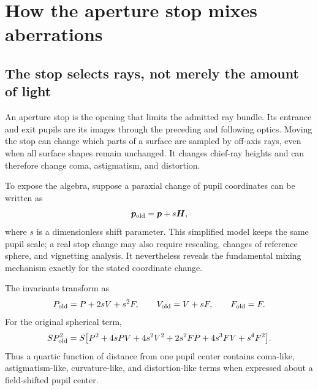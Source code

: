 \chapter{How the aperture stop mixes aberrations}
\label{ab:stop}

\section{The stop selects rays, not merely the amount of light}
An aperture stop is the opening that limits the admitted ray bundle. Its
entrance and exit pupils are its images through the preceding and following
optics. Moving the stop can change which parts of a surface are sampled by
off-axis rays, even when all surface shapes remain unchanged. It changes
chief-ray heights and can therefore change coma, astigmatism, and distortion.

To expose the algebra, suppose a paraxial change of pupil coordinates can be
written as
\begin{equation}
 \bm p_{\rm old}=\bm p+s\bm H,
 \label{ab:stopmap}
\end{equation}
where $s$ is a dimensionless shift parameter. This simplified model keeps
the same pupil scale; a real stop change may also require rescaling, changes
of reference sphere, and vignetting analysis. It nevertheless reveals the
fundamental mixing mechanism exactly for the stated coordinate change.

The invariants transform as
\begin{equation}
 P_{\rm old}=P+2sV+s^2F,\qquad
 V_{\rm old}=V+sF,\qquad F_{\rm old}=F.
\end{equation}
For the original spherical term,
\begin{align}
 S P_{\rm old}^2
 =S\bigl[P^2+4sPV+4s^2V^2+2s^2FP
             +4s^3FV+s^4F^2\bigr].
 \label{ab:stopS}
\end{align}
Thus a quartic function of distance from one pupil center contains coma-like,
astigmatism-like, curvature-like, and distortion-like terms when expressed
about a field-shifted pupil center.

